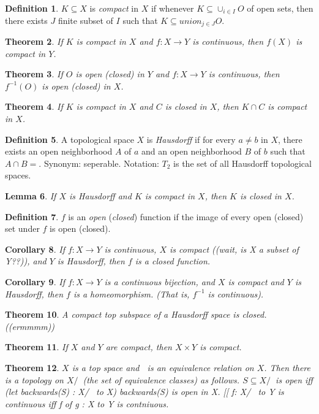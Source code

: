 \documentclass[11pt,leqno,oneside]{amsart}
\newtheorem{thm}{Theorem}[section]
\newtheorem{lem}[thm]{Lemma}
\newtheorem{cor}[thm]{Corollary}
\theoremstyle{definition}
\newtheorem{defn}[thm]{Definition}
\numberwithin{equation}{section}
\begin{document}
\begin{defn}
	$K \subseteq X$ is \emph{compact} in $X$ if whenever $K \subseteq \cup_{i \in I} O$ of open sets, then there exists $J$ finite subset of $I$ such that $K \subseteq union_{j \in J} O$.
\end{defn}
\begin{thm}
	If $K$ is compact in $X$ and $f:X \to Y$ is continuous, then $f(X)$ is compact in $Y$.
\end{thm}
\begin{thm}
	If $O$ is open (closed) in $Y$ and $f:X \to Y$ is continuous, then $f^{-1}(O)$ is open (closed) in $X$.
\end{thm}
\begin{thm}
	If $K$ is compact in $X$ and $C$ is closed in $X$, then $K \cap C$ is compact in $X$.
\end{thm}
\begin{defn}
	A topological space $X$ is \emph{Hausdorff} if for every $a \neq b$ in $X$, there exists an open neighborhood $A$ of $a$ and an open neighborhood $B$ of $b$ such that $A \cap B = {}$.  Synonym: seperable.  Notation: $T_2$ is the set of all Hausdorff topological spaces.
\end{defn}
\begin{lem}
	If $X$ is Hausdorff and $K$ is compact in $X$, then $K$ is closed in $X$.
\end{lem}
\begin{defn}
	$f$ is an \emph{open} (\emph{closed}) function if the image of every open (closed) set under $f$ is open (closed).
\end{defn}
\begin{cor}
	If $f : X \to Y$ is continuous, $X$ is compact ((wait, is X a subset of Y??)), and $Y$ is Hausdorff, then $f$ is a closed function.
\end{cor}
\begin{cor}
	If $f : X \to Y$ is a continuous bijection, and $X$ is compact and $Y$ is Hausdorff, then $f$ is a homeomorphism. (That is, $f^{-1}$ is continuous).
\end{cor}
\begin{thm}
	A compact top subspace of a Hausdorff space is closed. ((ermmmm))
\end{thm}
\begin{thm}
	If $X$ and $Y$ are compact, then $X \times Y$ is compact.
\end{thm}
\begin{thm}
	$X$ is a top space and $~$ is an equivalence relation on $X$.  Then there is a topology on $X/~$ (the set of equivalence classes) as follows.  $S \subseteq X/~$ is open iff (let backwards(S) : X/~ to X) backwards(S) is open in X.  [[ f: X/~ to Y is continuous iff f of g : X to Y is contniuous.
\end{thm}
\end{document}
